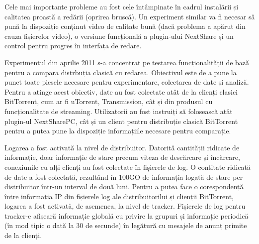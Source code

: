 Cele mai importante probleme au fost cele întâmpinate în cadrul instalării
și calitatea proastă a redării (oprirea bruscă). Un experiment similar va fi
necesar să pună la dispoziție conținut video de calitate bună (dacă problema
a apărut din cauza fișierelor video), o versiune funcțională a plugin-ului
NextShare și un control pentru progres în interfața de redare.

Experimentul din aprilie 2011 s-a concentrat pe testarea funcționalității de
bază pentru a compara distrbuția clasică cu redarea. Obiectivul este de a
pune la punct toate piesele necesare pentru experimentare, colectarea de date
și analiză. Pentru a atinge acest obiectiv, date au fost colectate atât de la
clienți clasici BitTorrent, cum ar fi uTorrent, Transmission, cât și din
produsul cu funcționalitate de streaming. Utilizatorii au fost instruiți să
folosească atât plugin-ul NextSharePC, cât și un client pentru distribuție
clasică BitTorrent pentru a putea pune la dispoziție informațiile necesare
pentru comparație.

Logarea a fost activată la nivel de distribuitor. Datorită cantității ridicate de
informație, doar informație de stare precum viteza de descărcare și încărcare,
conexiunile cu alți clienți au fost colectate în fișierele de log. O contitate
ridicată de date a fost colectată, rezultând în 100GO de informația logată de stare
per distribuitor într-un interval de două luni. Pentru a putea face o corespondență
între informația IP din fișierele log ale distribuitorilui și clienții BitTorrent,
logarea a fost activată, de asemenea, la nivel de tracker. Fișierele de log pentru
tracker-e afișeară informație globală cu privire la grupuri și informație periodică
(în mod tipic o dată la 30 de secunde) în legătură cu mesajele de anunț primite de
la clienți.

